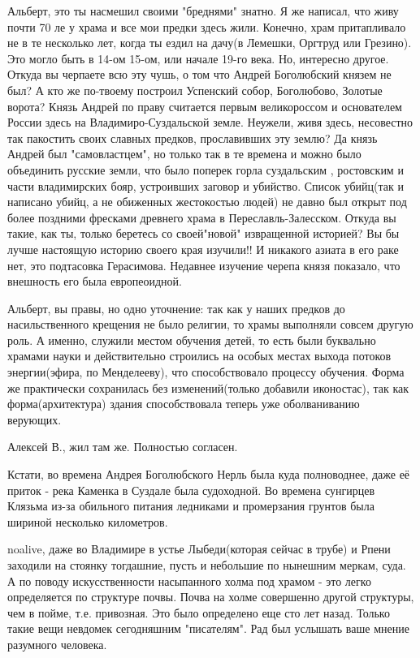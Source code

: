\begin{itemize}
Альберт, это ты насмешил своими "бреднями" знатно. Я же написал, что живу почти
70 ле у храма и все мои предки здесь жили. Конечно, храм притапливало не в те
несколько лет, когда ты ездил на дачу(в Лемешки, Оргтруд или Грезино). Это
могло быть в 14-ом 15-ом, или начале 19-го века. Но, интересно другое. Откуда
вы черпаете всю эту чушь, о том что Андрей Боголюбский князем не был? А кто же
по-твоему построил Успенский собор, Боголюбово, Золотые ворота? Князь Андрей по
праву считается первым великороссом и основателем России здесь на
Владимиро-Суздальской земле. Неужели, живя здесь, несовестно так пакостить
своих славных предков, прославивших эту землю? Да князь Андрей был
"самовластцем", но только так в те времена и можно было объединить русские
земли, что было поперек горла суздальским , ростовским и части владимирских
бояр, устроивших заговор и убийство. Список убийц(так и написано убийц, а не
обиженных жестокостью людей) не давно был открыт под более поздними фресками
древнего храма в Переславль-Залесском. Откуда вы такие, как ты, только беретесь
со своей"новой" извращенной историей? Вы бы лучше настоящую историю своего края
изучили!! И никакого азиата в его раке нет, это подтасовка Герасимова. Недавнее
изучение черепа князя показало, что внешность его была европеоидной.


Альберт, вы правы, но одно уточнение: так как у наших предков до
насильственного крещения не было религии, то храмы выполняли совсем другую
роль. А именно, служили местом обучения детей, то есть были буквально храмами
науки и действительно строились на особых местах выхода потоков энергии(эфира,
по Менделееву), что способствовало процессу обучения. Форма же практически
сохранилась без изменений(только добавили иконостас), так как
форма(архитектура) здания способствовала теперь уже оболваниванию верующих.


Алексей В., жил там же. Полностью согласен.

Кстати, во времена Андрея Боголюбского Нерль была куда полноводнее, даже её
приток - река Каменка в Суздале была судоходной. Во времена сунгирцев Клязьма
из-за обильного питания ледниками и промерзания грунтов была шириной несколько
километров.


noalive, даже во Владимире в устье Лыбеди(которая сейчас в трубе) и Рпени
заходили на стоянку тогдашние, пусть и небольшие по нынешним меркам, суда. А по
поводу искусственности насыпанного холма под храмом - это легко определяется по
структуре почвы. Почва на холме совершенно другой структуры, чем в пойме, т.е.
привозная. Это было определено еще сто лет назад. Только такие вещи невдомек
сегодняшним "писателям". Рад был услышать ваше мнение разумного человека.


\end{itemize}
